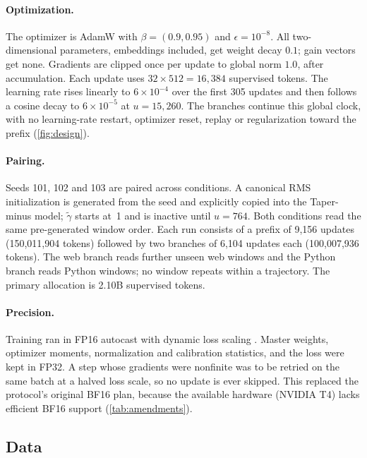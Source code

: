 \documentclass[11pt]{article}
\begin{document}
\paragraph{Optimization.} The optimizer is AdamW \citep{loshchilov2019adamw} with $\beta = (0.9, 0.95)$ and
$\epsilon = 10^{-8}$. All two-dimensional parameters, embeddings included, get weight decay $0.1$; gain vectors
get none. Gradients are clipped once per update to global norm $1.0$, after accumulation. Each update uses
$32 \times 512 = 16{,}384$ supervised tokens. The learning rate rises linearly to $6\times10^{-4}$ over the first
305 updates and then follows a cosine decay to $6\times10^{-5}$ at $u = 15{,}260$. The branches continue this
global clock, with no learning-rate restart, optimizer reset, replay or regularization toward the prefix
(\cref{fig:design}).

\paragraph{Pairing.} Seeds 101, 102 and 103 are paired across conditions. A canonical RMS initialization is
generated from the seed and explicitly copied into the Taper-minus model; $\tilde\gamma$ starts at~1 and is
inactive until $u = 764$. Both conditions read the same pre-generated window order. Each run consists of a prefix
of 9{,}156 updates (150{,}011{,}904 tokens) followed by two branches of 6{,}104 updates each (100{,}007{,}936
tokens). The web branch reads further unseen web windows and the Python branch reads Python windows; no window
repeats within a trajectory. The primary allocation is 2.10B supervised tokens.

\paragraph{Precision.} Training ran in FP16 autocast with dynamic loss scaling \citep{micikevicius2018mixed}.
Master weights, optimizer moments, normalization and calibration statistics, and the loss were kept in FP32.
A step whose gradients were nonfinite was to be retried on the same batch at a halved loss scale, so no update
is ever skipped. This replaced the protocol's original BF16 plan, because the available hardware (NVIDIA T4)
lacks efficient BF16 support (\cref{tab:amendments}).

\subsection{Data}
\end{document}
